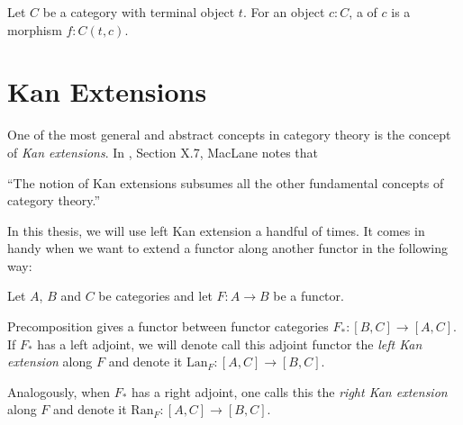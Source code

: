 \begin{definition}
  Let $ C $ be a category with terminal object $ t $. For an object $ c: C $, a  of $ c $ is a morphism $ f: C(t, c) $.
\end{definition}


\section{Kan Extensions}
One of the most general and abstract concepts in category theory is the concept of \textit{Kan extensions}. In \autocite{MacLane}, Section X.7, MacLane notes that

\enquote{The notion of Kan extensions subsumes all the other fundamental concepts of category theory.}

In this thesis, we will use left Kan extension a handful of times. It comes in handy when we want to extend a functor along another functor in the following way:

Let $ A $, $ B $ and $ C $ be categories and let $ F : A \to B $ be a functor.
\begin{definition}
  Precomposition gives a functor between functor categories $ F_* : [B, C] \to [A, C] $. If $ F_* $ has a left adjoint, we will denote call this adjoint functor the \textit{left Kan extension} along $ F $ and denote it $ \mathrm{Lan}_F : [A, C] \to [B, C] $.

  \begin{center}
    \qquad
  \end{center}

  Analogously, when $ F_* $ has a right adjoint, one calls this the \textit{right Kan extension} along $ F $ and denote it $ \mathrm{Ran}_F: [A, C] \to [B, C] $.
\end{definition}

